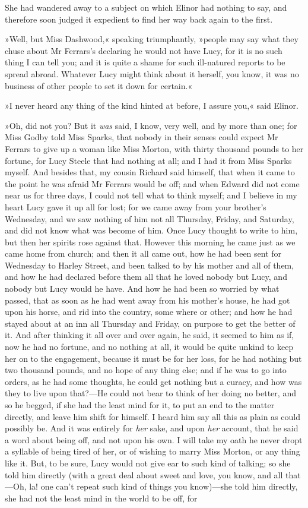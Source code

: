 She had wandered away to a subject on which Elinor had nothing to say, and therefore soon judged it expedient to find her way back again to the first.

»Well, but Miss Dashwood,« speaking triumphantly, »people may say what they chuse about Mr Ferrars’s declaring he would not have Lucy, for it is no such thing I can tell you; and it is quite a shame for such ill-natured reports to be spread abroad. Whatever Lucy might think about it herself, you know, it was no business of other people to set it down for certain.«

»I never heard any thing of the kind hinted at before, I assure you,« said Elinor.

»Oh, did not you? But it \textit{was} said, I know, very well, and by more than one; for Miss Godby told Miss Sparks, that nobody in their senses could expect Mr Ferrars to give up a woman like Miss Morton, with thirty thousand pounds to her fortune, for Lucy Steele that had nothing at all; and I had it from Miss Sparks myself. And besides that, my cousin Richard said himself, that when it came to the point he was afraid Mr Ferrars would be off; and when Edward did not come near us for three days, I could not tell what to think myself; and I believe in my heart Lucy gave it up all for lost; for we came away from your brother’s Wednesday, and we saw nothing of him not all Thursday, Friday, and Saturday, and did not know what was become of him. Once Lucy thought to write to him, but then her spirits rose against that. However this morning he came just as we came home from church; and then it all came out, how he had been sent for Wednesday to Harley Street, and been talked to by his mother and all of them, and how he had declared before them all that he loved nobody but Lucy, and nobody but Lucy would he have. And how he had been so worried by what passed, that as soon as he had went away from his mother’s house, he had got upon his horse, and rid into the country, some where or other; and how he had stayed about at an inn all Thursday and Friday, on purpose to get the better of it. And after thinking it all over and over again, he said, it seemed to him as if, now he had no fortune, and no nothing at all, it would be quite unkind to keep her on to the engagement, because it must be for her loss, for he had nothing but two thousand pounds, and no hope of any thing else; and if he was to go into orders, as he had some thoughts, he could get nothing but a curacy, and how was they to live upon that?—He could not bear to think of her doing no better, and so he begged, if she had the least mind for it, to put an end to the matter directly, and leave him shift for himself. I heard him say all this as plain as could possibly be. And it was entirely for \textit{her} sake, and upon \textit{her} account, that he said a word about being off, and not upon his own. I will take my oath he never dropt a syllable of being tired of her, or of wishing to marry Miss Morton, or any thing like it. But, to be sure, Lucy would not give ear to such kind of talking; so she told him directly (with a great deal about sweet and love, you know, and all that—Oh, la! one can’t repeat such kind of things you know)—she told him directly, she had not the least mind in the world to be off, for 
